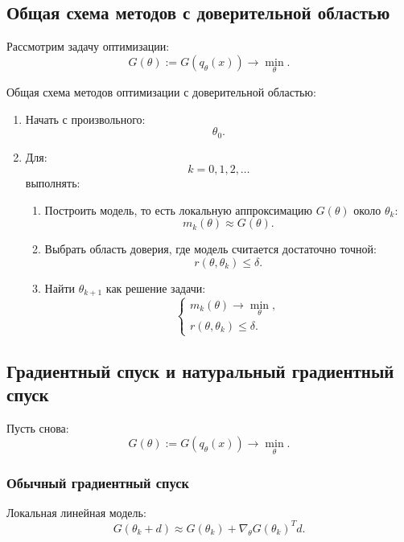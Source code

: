 \documentclass[12pt,a4paper]{article}
\begin{document}
\subsection{Общая схема методов с доверительной областью}

Рассмотрим задачу оптимизации:
\[
G(\theta)
:=
G(q_\theta(x))
\to
\min_\theta.
\]

Общая схема методов оптимизации с доверительной областью:

\begin{enumerate}
    \item Начать с произвольного:
    \[
    \theta_0.
    \]

    \item Для:
    \[
    k=0,1,2,\ldots
    \]
    выполнять:

    \begin{enumerate}
        \item Построить модель, то есть локальную аппроксимацию $G(\theta)$ около $\theta_k$:
        \[
        m_k(\theta)
        \approx
        G(\theta).
        \]

        \item Выбрать область доверия, где модель считается достаточно точной:
        \[
        r(\theta,\theta_k)
        \le
        \delta.
        \]

        \item Найти $\theta_{k+1}$ как решение задачи:
        \[
        \begin{cases}
        m_k(\theta)
        \to
        \min\limits_\theta,
        \\[0.4em]
        r(\theta,\theta_k)
        \le
        \delta.
        \end{cases}
        \]
    \end{enumerate}
\end{enumerate}

\subsection{Градиентный спуск и натуральный градиентный спуск}

Пусть снова:
\[
G(\theta)
:=
G(q_\theta(x))
\to
\min_\theta.
\]

\subsubsection{Обычный градиентный спуск}

Локальная линейная модель:
\[
G(\theta_k+d)
\approx
G(\theta_k)
+
\nabla_\theta G(\theta_k)^T d.
\]
\end{document}
